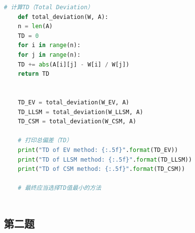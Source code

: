 \documentclass{article}
\begin{document}
\begin{lstlisting}[language=Python]
	# 计算TD（Total Deviation）
	def total_deviation(W, A):
	n = len(A)
	TD = 0
	for i in range(n):
	for j in range(n):
	TD += abs(A[i][j] - W[i] / W[j])
	return TD
	
	
	TD_EV = total_deviation(W_EV, A)
	TD_LLSM = total_deviation(W_LLSM, A)
	TD_CSM = total_deviation(W_CSM, A)
	
	# 打印总偏差（TD）
	print("TD of EV method: {:.5f}".format(TD_EV))
	print("TD of LLSM method: {:.5f}".format(TD_LLSM))
	print("TD of CSM method: {:.5f}".format(TD_CSM))
	
	# 最终应当选择TD值最小的方法
	
\end{lstlisting}

\subsection{第二题}
\end{document}
